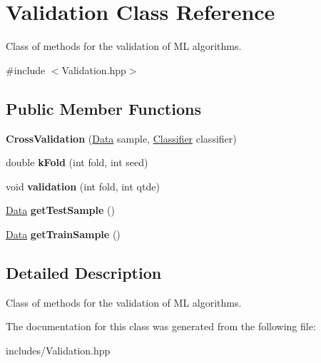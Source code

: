 \hypertarget{class_validation}{}\section{Validation Class Reference}
\label{class_validation}


Class of methods for the validation of ML algorithms.  




{\ttfamily \#include $<$Validation.\+hpp$>$}

\subsection*{Public Member Functions}
\begin{DoxyCompactItemize}
\item 
\mbox{\label{class_validation_ab58bb5bc64a10f5c8260b8bbadd5e9ce}} 
{\bfseries Cross\+Validation} (\hyperlink{class_data}{Data} sample, \hyperlink{class_classifier}{Classifier} classifier)
\item 
\mbox{\label{class_validation_a3aae72caef37b12a57aaf5cdd862de3a}} 
double {\bfseries k\+Fold} (int fold, int seed)
\item 
\mbox{\label{class_validation_a166305aa3f117b119da69d54778286a0}} 
void {\bfseries validation} (int fold, int qtde)
\item 
\mbox{\label{class_validation_a6ef1b8600535a064b9a94507afdf849c}} 
\hyperlink{class_data}{Data} {\bfseries get\+Test\+Sample} ()
\item 
\mbox{\label{class_validation_a656f4919ec48a7f26063d046d583433a}} 
\hyperlink{class_data}{Data} {\bfseries get\+Train\+Sample} ()
\end{DoxyCompactItemize}


\subsection{Detailed Description}
Class of methods for the validation of ML algorithms. 

The documentation for this class was generated from the following file\+:\begin{DoxyCompactItemize}
\item 
includes/Validation.\+hpp\end{DoxyCompactItemize}
